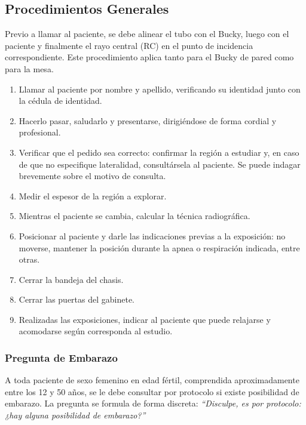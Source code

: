 	\subsection{Procedimientos Generales}
	
	Previo a llamar al paciente, se debe alinear el tubo con el Bucky, luego con el paciente y finalmente el rayo central (RC) en el punto de incidencia correspondiente. Este procedimiento aplica tanto para el Bucky de pared como para la mesa.
	
	\begin{enumerate}
		\item Llamar al paciente por nombre y apellido, verificando su identidad junto con la cédula de identidad.
		\item Hacerlo pasar, saludarlo y presentarse, dirigiéndose de forma cordial y profesional.
		\item Verificar que el pedido sea correcto: confirmar la región a estudiar y, en caso de que no especifique lateralidad, consultársela al paciente. Se puede indagar brevemente sobre el motivo de consulta.
		\item Medir el espesor de la región a explorar.
		\item Mientras el paciente se cambia, calcular la técnica radiográfica.
		\item Posicionar al paciente y darle las indicaciones previas a la exposición: no moverse, mantener la posición durante la apnea o respiración indicada, entre otras.
		\item Cerrar la bandeja del chasis.
		\item Cerrar las puertas del gabinete.
		\item Realizadas las exposiciones, indicar al paciente que puede relajarse y acomodarse según corresponda al estudio.
	\end{enumerate}
	
	\subsubsection*{Pregunta de Embarazo}
	
	A toda paciente de sexo femenino en edad fértil, comprendida aproximadamente entre los 12 y 50 años, se le debe consultar por protocolo si existe posibilidad de embarazo. La pregunta se formula de forma discreta: \textit{``Disculpe, es por protocolo: ¿hay alguna posibilidad de embarazo?''}
	
